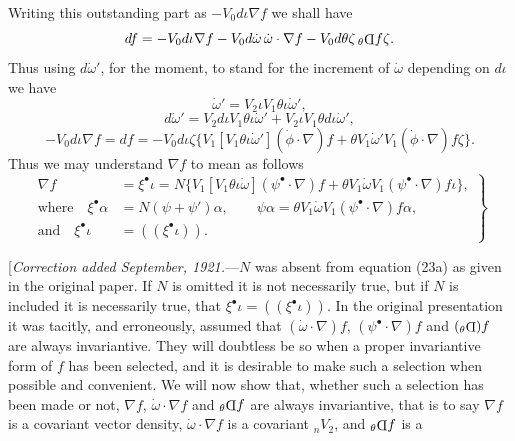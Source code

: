 \documentclass[11pt]{article}
\newcommand{\invd}{\mathord{\vcenter{\hbox{\rotatebox[origin=c]{180}{\(\mathrm{D}\)}}}}}
\newcommand{\thetaPi}{{}_\theta\invd}
\begin{document}
\indent [In Maxwell's own case $(\dot\phi\mathbin{\cdot}\nabla)f=(-I+N)\omega^\times$ and we might assume this equation to hold in general, though this is not done below.] Writing this outstanding part as $-V_0d\iota\nabla f$ we shall have
\[
  df=-V_0d\iota\nabla f-V_0d\dot\omega\,\dot\omega\mathbin{\cdot}\nabla f-V_0d\theta\zeta\,\thetaPi f\zeta.
\]
Thus using $d\dot\omega'$, for the moment, to stand for the increment of $\dot\omega$ depending on $d\iota$ we have
\[
  \dot\omega'=V_2\iota V_1\theta\iota\dot\omega',
\]
\[
  d\dot\omega'=V_2d\iota V_1\theta\iota\dot\omega'+V_2\iota V_1\theta d\iota\dot\omega',
\]
\[
  -V_0d\iota\nabla f=df=-V_0d\iota\zeta\bigl\{V_1[V_1\theta\iota\dot\omega'](\dot\phi\mathbin{\cdot}\nabla)f+\theta V_1\dot\omega'V_1(\dot\phi\mathbin{\cdot}\nabla)f\zeta\bigr\}.
\]
Thus we may understand $\nabla f$ to mean as follows
\begin{equation}
  \left.\begin{aligned}
    \nabla f&=\xi^\bullet\iota
      =N\bigl\{V_1[V_1\theta\iota\dot\omega](\psi^\bullet\mathbin{\cdot}\nabla)f
       +\theta V_1\dot\omega V_1(\psi^\bullet\mathbin{\cdot}\nabla)f\iota\bigr\},\\
    \text{where}\quad \xi^\bullet\alpha&=N(\psi+\psi')\alpha,\qquad
      \psi\alpha=\theta V_1\dot\omega V_1(\psi^\bullet\mathbin{\cdot}\nabla)f\alpha,\\
    \text{and}\quad \xi^\bullet\iota&=((\xi^\bullet\iota)).
  \end{aligned}\right\}
  \tag{23a}
\end{equation}

\indent [\emph{Correction added September, 1921.}---$N$ was absent from equation (23a) as given in the original paper. If $N$ is omitted it is not necessarily true, but if $N$ is included it is necessarily true, that $\xi^\bullet\iota=((\xi^\bullet\iota))$. In the original presentation it was tacitly, and erroneously, assumed that $(\dot\omega\mathbin{\cdot}\nabla)f$, $(\psi^\bullet\mathbin{\cdot}\nabla)f$ and $(\thetaPi)f$ are always invariantive. They will doubtless be so when a proper invariantive form of $f$ has been selected, and it is desirable to make such a selection when possible and convenient. We will now show that, whether such a selection has been made or not, $\nabla f$, $\dot\omega\mathbin{\cdot}\nabla f$ and $\thetaPi f$ are always invariantive, that is to say $\nabla f$ is a covariant vector density, $\dot\omega\mathbin{\cdot}\nabla f$ is a covariant ${}_nV_2$, and $\thetaPi f$ is a
\end{document}
